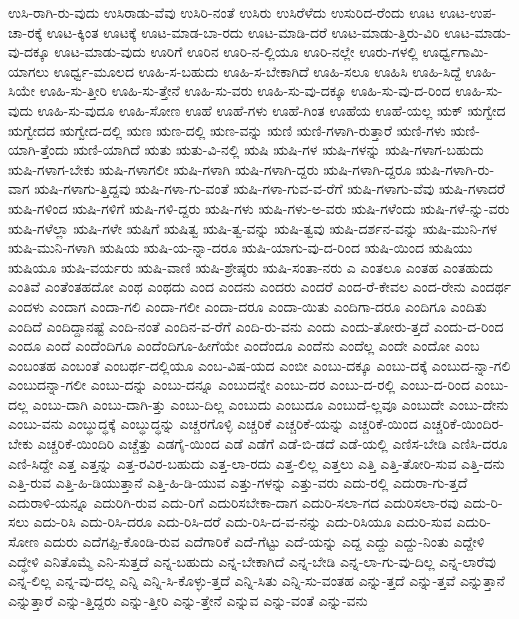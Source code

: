 {ಉಸಿ-ರಾಗಿ-ರು-ವುದು
ಉಸಿರಾಡು-ವೆವು
ಉಸಿರಿ-ನಂತೆ
ಉಸಿರು
ಉಸಿರೆಳೆದು
ಉಸುರಿದ-ರೆಂದು
ಊಟ
ಊಟ-ಉಪ-ಚಾ-ರಕ್ಕೆ
ಊಟ-ಕ್ಕಿಂತ
ಊಟಕ್ಕೆ
ಊಟ-ಮಾಡ-ಬಾ-ರದು
ಊಟ-ಮಾಡಿ-ದರೆ
ಊಟ-ಮಾಡು-ತ್ತಿರು-ವಿರಿ
ಊಟ-ಮಾಡು-ವು-ದಕ್ಕೂ
ಊಟ-ಮಾಡು-ವುದು
ಊರಿಗೆ
ಊರಿನ
ಊರಿ-ನ-ಲ್ಲಿಯೂ
ಊರಿ-ನಲ್ಲೇ
ಊರು-ಗಳಲ್ಲಿ
ಊರ್ಧ್ವಗಾಮಿ-ಯಾಗಲು
ಊರ್ಧ್ವ-ಮೂಲದ
ಊಹಿ-ಸ-ಬಹುದು
ಊಹಿ-ಸ-ಬೇಕಾಗಿದೆ
ಊಹಿ-ಸಲೂ
ಊಹಿಸಿ
ಊಹಿ-ಸಿದ್ದೆ
ಊಹಿ-ಸಿಯೇ
ಊಹಿ-ಸು-ತ್ತೀರಿ
ಊಹಿ-ಸು-ತ್ತೇನೆ
ಊಹಿ-ಸು-ವರು
ಊಹಿ-ಸು-ವು-ದಕ್ಕೂ
ಊಹಿ-ಸು-ವು-ದ-ರಿಂದ
ಊಹಿ-ಸು-ವುದು
ಊಹಿ-ಸು-ವುದೂ
ಊಹಿ-ಸೋಣ
ಊಹೆ
ಊಹೆ-ಗಳು
ಊಹೆ-ಗಿಂತ
ಊಹೆಯ
ಊಹೆ-ಯಲ್ಲ
ಋಕ್
ಋಗ್ವೇದ
ಋಗ್ವೇದದ
ಋಗ್ವೇದ-ದಲ್ಲಿ
ಋಣ
ಋಣ-ದಲ್ಲಿ
ಋಣ-ವನ್ನು
ಋಣಿ
ಋಣಿ-ಗಳಾಗಿ-ರುತ್ತಾರೆ
ಋಣಿ-ಗಳು
ಋಣಿ-ಯಾಗಿ-ತ್ತೆಂದು
ಋಣಿ-ಯಾಗಿದೆ
ಋತು
ಋತು-ವಿ-ನಲ್ಲಿ
ಋಷಿ
ಋಷಿ-ಗಳ
ಋಷಿ-ಗಳನ್ನು
ಋಷಿ-ಗಳಾಗ-ಬಹುದು
ಋಷಿ-ಗಳಾಗ-ಬೇಕು
ಋಷಿ-ಗಳಾಗಲೀ
ಋಷಿ-ಗಳಾಗಿ
ಋಷಿ-ಗಳಾಗಿ-ದ್ದರು
ಋಷಿ-ಗಳಾಗಿ-ದ್ದರೂ
ಋಷಿ-ಗಳಾಗಿ-ರು-ವಾಗ
ಋಷಿ-ಗಳಾಗು-ತ್ತಿದ್ದವು
ಋಷಿ-ಗಳಾ-ಗು-ವಂತೆ
ಋಷಿ-ಗಳಾ-ಗುವ-ವ-ರೆಗೆ
ಋಷಿ-ಗಳಾಗು-ವೆವು
ಋಷಿ-ಗಳಾದರೆ
ಋಷಿ-ಗಳಿಂದ
ಋಷಿ-ಗಳಿಗೆ
ಋಷಿ-ಗಳಿ-ದ್ದರು
ಋಷಿ-ಗಳು
ಋಷಿ-ಗಳು-ಅ-ವರು
ಋಷಿ-ಗಳೆಂದು
ಋಷಿ-ಗಳೆ-ನ್ನು-ವರು
ಋಷಿ-ಗಳೆಲ್ಲಾ
ಋಷಿ-ಗಳೇ
ಋಷಿಗೆ
ಋಷಿತ್ವ
ಋಷಿ-ತ್ವ-ವನ್ನು
ಋಷಿ-ತ್ವವು
ಋಷಿ-ದರ್ಶನ-ವನ್ನು
ಋಷಿ-ಮುನಿ-ಗಳ
ಋಷಿ-ಮುನಿ-ಗಳಾಗಿ
ಋಷಿಯ
ಋಷಿ-ಯ-ನ್ನಾ-ದರೂ
ಋಷಿ-ಯಾಗು-ವು-ದ-ರಿಂದ
ಋಷಿ-ಯಿಂದ
ಋಷಿಯು
ಋಷಿಯೂ
ಋಷಿ-ವರ್ಯರು
ಋಷಿ-ವಾಣಿ
ಋಷಿ-ಶ್ರೇಷ್ಠರು
ಋಷಿ-ಸಂತಾ-ನರು
ಎ
ಎಂತಲೂ
ಎಂತಹ
ಎಂತಹುದು
ಎಂತಿವೆ
ಎಂತೆಂತಹದೋ
ಎಂಥ
ಎಂಥದು
ಎಂದ
ಎಂದನು
ಎಂದರು
ಎಂದರೆ
ಎಂದ-ರೆ-ಕೇವಲ
ಎಂದ-ರೇನು
ಎಂದರ್ಥ
ಎಂದಳು
ಎಂದಾಗ
ಎಂದಾ-ಗಲಿ
ಎಂದಾ-ಗಲೀ
ಎಂದಾ-ದರೂ
ಎಂದಾ-ಯಿತು
ಎಂದಿಗಾ-ದರೂ
ಎಂದಿಗೂ
ಎಂದಿತು
ಎಂದಿದೆ
ಎಂದಿದ್ದಾನಷ್ಟೆ
ಎಂದಿ-ನಂತೆ
ಎಂದಿನ-ವ-ರೆಗೆ
ಎಂದಿ-ರು-ವನು
ಎಂದು
ಎಂದು-ತೋರು-ತ್ತದೆ
ಎಂದು-ದ-ರಿಂದ
ಎಂದೂ
ಎಂದೆ
ಎಂದೆಂದಿಗೂ
ಎಂದೆಂದಿಗೂ-ಹೀಗೆಯೇ
ಎಂದೆಂದೂ
ಎಂದೆನು
ಎಂದೆಲ್ಲ
ಎಂದೇ
ಎಂದೋ
ಎಂಬ
ಎಂಬಂತಹ
ಎಂಬಂತೆ
ಎಂಬರ್ಥ-ದಲ್ಲಿಯೂ
ಎಂಬ-ವಿಷ-ಯದ
ಎಂಬೀ
ಎಂಬು-ದಕ್ಕೂ
ಎಂಬು-ದಕ್ಕೆ
ಎಂಬುದ-ನ್ನಾ-ಗಲಿ
ಎಂಬುದನ್ನಾ-ಗಲೀ
ಎಂಬು-ದನ್ನು
ಎಂಬು-ದನ್ನೂ
ಎಂಬುದನ್ನೇ
ಎಂಬು-ದರ
ಎಂಬು-ದ-ರಲ್ಲಿ
ಎಂಬು-ದ-ರಿಂದ
ಎಂಬು-ದಲ್ಲ
ಎಂಬು-ದಾಗಿ
ಎಂಬು-ದಾಗಿ-ತ್ತು
ಎಂಬು-ದಿಲ್ಲ
ಎಂಬುದು
ಎಂಬುದೂ
ಎಂಬುದೆ-ಲ್ಲವೂ
ಎಂಬುದೇ
ಎಂಬು-ದೇನು
ಎಂಬು-ವನು
ಎಂಬ್ಧುದ್ಧಕ್ಕೆ
ಎಂಬ್ಧುದ್ಧನ್ನು
ಎಚ್ಚರಗೊಳ್ಳಿ
ಎಚ್ಚರಿಕೆ
ಎಚ್ಚರಿಕೆ-ಯನ್ನು
ಎಚ್ಚರಿಕೆ-ಯಿಂದ
ಎಚ್ಚರಿಕೆ-ಯಿಂದಿರ-ಬೇಕು
ಎಚ್ಚರಿಕೆ-ಯಿಂದಿರಿ
ಎಚ್ಚೆತ್ತು
ಎಡಗೈ-ಯಿಂದ
ಎಡೆ
ಎಡೆಗೆ
ಎಡೆ-ಬಿ-ಡದೆ
ಎಡೆ-ಯಲ್ಲಿ
ಎಣಿಸ-ಬೇಡಿ
ಎಣಿಸಿ-ದರೂ
ಎಣಿ-ಸಿದ್ದೇ
ಎತ್ತ
ಎತ್ತನ್ನು
ಎತ್ತ-ರವಿರ-ಬಹುದು
ಎತ್ತ-ಲಾ-ರದು
ಎತ್ತ-ಲಿಲ್ಲ
ಎತ್ತಲು
ಎತ್ತಿ
ಎತ್ತಿ-ತೋರಿ-ಸುವ
ಎತ್ತಿ-ದನು
ಎತ್ತಿ-ರುವ
ಎತ್ತಿ-ಹಿ-ಡಿಯುತ್ತಾನೆ
ಎತ್ತಿ-ಹಿ-ಡಿ-ಯುವ
ಎತ್ತು-ಗಳನ್ನು
ಎತ್ತು-ವರು
ಎದು-ರಲ್ಲಿ
ಎದುರಾ-ಗು-ತ್ತದೆ
ಎದುರಾಳಿ-ಯನ್ನೂ
ಎದುರಿಗಿ-ರುವ
ಎದು-ರಿಗೆ
ಎದುರಿಸಬೇಕಾ-ದಾಗ
ಎದುರಿ-ಸಲಾ-ಗದ
ಎದುರಿಸಲಾ-ರವು
ಎದು-ರಿ-ಸಲು
ಎದು-ರಿಸಿ
ಎದು-ರಿಸಿ-ದರೂ
ಎದು-ರಿಸಿ-ದರೆ
ಎದು-ರಿಸಿ-ದ-ವ-ನನ್ನು
ಎದು-ರಿಸಿಯೂ
ಎದುರಿ-ಸುವ
ಎದುರಿ-ಸೋಣ
ಎದುರು
ಎದೆಗಪ್ಪಿ-ಕೊಂಡಿ-ರುವ
ಎದೆಗಾರಿಕೆ
ಎದೆ-ಗೆಟ್ಟು
ಎದೆ-ಯನ್ನು
ಎದ್ದ
ಎದ್ದು
ಎದ್ದು-ನಿಂತು
ಎದ್ದೇಳಿ
ಎದ್ಧೇಳಿ
ಎನಿತೊಮ್ಮೆ
ಎನಿ-ಸುತ್ತದೆ
ಎನ್ನ-ಬಹುದು
ಎನ್ನ-ಬೇಕಾಗಿದೆ
ಎನ್ನ-ಬೇಡಿ
ಎನ್ನ-ಲಾ-ಗು-ವು-ದಿಲ್ಲ
ಎನ್ನ-ಲಾರೆವು
ಎನ್ನ-ಲಿಲ್ಲ
ಎನ್ನ-ವು-ದಲ್ಲ
ಎನ್ನಿ
ಎನ್ನಿ-ಸಿ-ಕೊಳ್ಳು-ತ್ತದೆ
ಎನ್ನಿ-ಸಿತು
ಎನ್ನಿ-ಸು-ವಂತಹ
ಎನ್ನು-ತ್ತದೆ
ಎನ್ನು-ತ್ತವೆ
ಎನ್ನುತ್ತಾನೆ
ಎನ್ನುತ್ತಾರೆ
ಎನ್ನು-ತ್ತಿದ್ದರು
ಎನ್ನು-ತ್ತೀರಿ
ಎನ್ನು-ತ್ತೇನೆ
ಎನ್ನುವ
ಎನ್ನು-ವಂತೆ
ಎನ್ನು-ವನು
}
